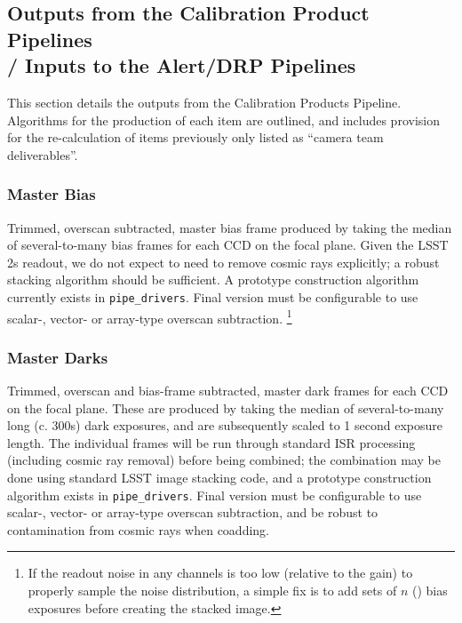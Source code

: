
\subsection{Outputs from the Calibration Product Pipelines \\
	/ Inputs to the Alert/DRP Pipelines}
\label{sec:CPP:output}

This section details the outputs from the Calibration Products Pipeline. Algorithms for the production of each item are outlined, and includes provision for the re-calculation of items previously only listed as ``camera team deliverables''.

\subsubsection{Master Bias}\label{sec:CPP:output:bias}
Trimmed, overscan subtracted, master bias frame produced by taking the median of several-to-many bias frames for each CCD on the focal plane. 
\alg Given the LSST 2s readout, we do not expect to need to remove cosmic rays explicitly; a robust stacking algorithm should be sufficient. A prototype construction algorithm currently exists in \texttt{pipe\_drivers}. Final version must be configurable to use scalar-, vector- or array-type overscan subtraction. 
\footnote{If the readout noise in any channels is too low (relative to the
gain) to properly sample the noise distribution, a simple fix is to add sets of $n$ () bias exposures before creating the stacked image.}


\subsubsection{Master Darks}\label{sec:CPP:output:dark}
Trimmed, overscan and bias-frame subtracted, master dark frames for each CCD on the focal plane. These are produced by taking the median of several-to-many long (c. 300s) dark exposures, and are subsequently scaled to 1 second exposure length.  
\alg The individual frames will be run through standard ISR processing (including cosmic ray removal) before
being combined; the combination may be done using standard LSST image stacking code, and a prototype construction algorithm exists in \texttt{pipe\_drivers}. Final version must be configurable to use scalar-, vector- or array-type overscan subtraction, and be robust to contamination from cosmic rays when coadding.


